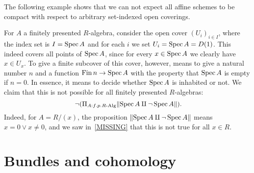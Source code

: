 \documentclass{zariski}
\begin{document}
The following example shows that we can not expect all affine schemes
to be compact with respect to arbitrary set-indexed open coverings.

\begin{example}
  For $A$ a finitely presented $R$-algebra,
  consider the open cover ${(U_i)}_{i \in I}$,
  where the index set is $I = \operatorname{Spec} A$
  and for each $i$ we set $U_i = \operatorname{Spec} A = D(1)$.
  This indeed covers all points of $\operatorname{Spec} A$,
  since for every $x \in \operatorname{Spec} A$ we clearly have $x \in U_x$.
  To give a finite subcover of this cover, however,
  means to give a natural number $n$ and a function $\operatorname{Fin} n \to \operatorname{Spec} A$
  with the property that $\operatorname{Spec} A$ is empty if $n = 0$.
  In essence, it means to decide whether $\operatorname{Spec} A$ is inhabited or not.
  We claim that this is not possible for all finitely presented $R$-algebras:
  \[ \lnot (\Pi_{A : f.p. R\text{-Alg}} \propTrunc{\Spec A \amalg \lnot \Spec A} )
     \rlap{.} \]
  Indeed, for $A = R/(x)$,
  the proposition $\lVert \operatorname{Spec} A \amalg \lnot \operatorname{Spec} A \rVert$
  means $x = 0 \lor x \neq 0$,
  and we saw in~\ref{MISSING} that this is not true for all $x \in R$.
\end{example}


\section{Bundles and cohomology}

\end{document}
